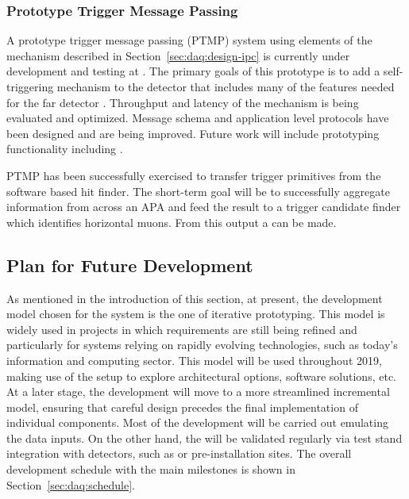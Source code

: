 \subsubsection{Prototype Trigger Message Passing}

A prototype trigger message passing (PTMP) system using elements of the  mechanism described in Section~\ref{sec:daq:design-ipc} is currently under development and testing at .
The primary goals of this prototype is to add a self-triggering mechanism to the  detector that includes many of the features needed for the far detector .
Throughput and latency of the mechanism is being evaluated and optimized.
Message schema and application level protocols have been designed and are being improved.
Future work will include prototyping  functionality including .

PTMP has been successfully exercised to transfer trigger primitives from the software based hit finder. The short-term goal will be to successfully aggregate information from across an APA and feed the result to a trigger candidate finder which identifies horizontal muons. From this output a  can be made.


\subsection{Plan for Future Development}
\label{sec:daq:design-plans}

As mentioned in the introduction of this section, at present, the development model chosen for the  system is the one of iterative prototyping.
This model is widely used in projects in which requirements are still
being refined and particularly for systems relying on rapidly evolving technologies, such as today's information and computing sector. 
This model will be used throughout 2019, making use of the  setup to explore architectural options, software solutions, etc.
At a later stage, the  development will move to a more streamlined incremental model, ensuring that careful design precedes the final implementation of individual components.
Most of the development will be carried out emulating the data inputs.
On the other hand, the  will be validated regularly via test stand integration with detectors, such as  or pre-installation sites.
The overall development schedule with the main  milestones is shown in Section~\ref{sec:daq:schedule}.

